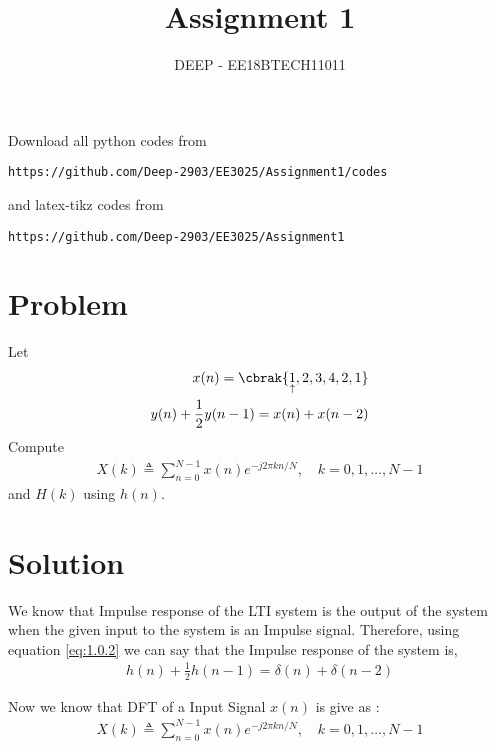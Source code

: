 \documentclass[journal,12pt,twocolumn]{IEEEtran}
\begin{document}
     \def\rightbox#1{\makebox[0in][r]{#1}}
     \def\centbox#1{\makebox[0in]{#1}}
     \def\topbox#1{\raisebox{-\baselineskip}[0in][0in]{#1}}
     \def\midbox#1{\raisebox{-0.5\baselineskip}[0in][0in]{#1}}
\vspace{3cm}
\title{Assignment 1}
\author{DEEP - EE18BTECH11011}
\maketitle
\newpage
\bigskip
\renewcommand{\thefigure}{\theenumi}
\renewcommand{\thetable}{\theenumi}
Download all python codes from 
\begin{lstlisting}
https://github.com/Deep-2903/EE3025/Assignment1/codes
\end{lstlisting}
%
and latex-tikz codes from 
%
\begin{lstlisting}
https://github.com/Deep-2903/EE3025/Assignment1
\end{lstlisting}
\section{Problem}
Let
\begin{align}
    x(n) = \cbrak{\underset{\uparrow}{1},2,3,4,2,1} \\
    y(n) + \frac{1}{2}y(n-1) = x(n) + x(n-2) \label{eq:1.0.2}
\end{align}
Compute
\begin{align}
    X(k) \triangleq \sum_{n=0}^{N-1}x(n)e^{-j2\pi kn/N},\quad k=0,1, \ldots, N-1
\end{align}
and $H(k)$ using $h(n)$.

\section{Solution}
We know that Impulse response of the LTI system is the output of the system when the given input to the system is an Impulse signal. Therefore, using  equation \eqref{eq:1.0.2} we can say that the Impulse response of the system is,
\begin{align}
    h(n) + \frac{1}{2}h(n-1) = \delta(n) + \delta(n-2)	
\end{align}

Now we know that DFT of a Input Signal $x(n)$ is give as :
\begin{align}
    X(k) \triangleq \sum_{n=0}^{N-1}x(n)e^{-j2\pi kn/N},\quad k=0,1, \ldots, N-1 \label{eq:2.0.2}
\end{align}
\end{document}
